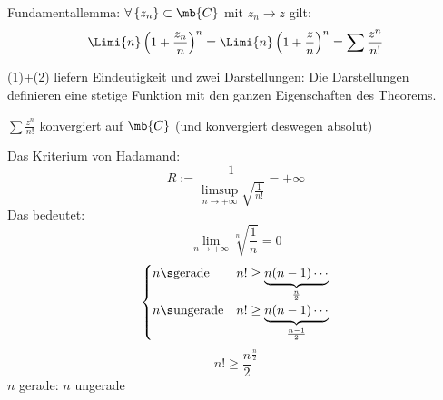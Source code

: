\begin{Lem}
  Fundamentallemma: $\forall \left\{ z_n \right\}\subset\mb{C}$ mit $z_n\to z$ gilt:
  \[\Limi{n}\left( 1+\frac{z_n}{n}\right)^n=\Limi{n}\left( 1+\frac{z}{n}\right)^n=\sum \frac{z^n}{n!}\]
\end{Lem}
\begin{Bem}
  (1)+(2) liefern Eindeutigkeit und zwei Darstellungen: Die Darstellungen definieren eine stetige Funktion mit den ganzen Eigenschaften des Theorems.
\end{Bem}
\begin{Bem}
  $\sum \frac{z^n}{n!}$ konvergiert auf $\mb{C}$ (und konvergiert deswegen absolut)
\end{Bem}
\begin{Bew}
  Das Kriterium von Hadamand:
  \[R:=\frac{1}{\limsup_{n\to+\infty}\sqrt{\frac{1}{n!}}}=+\infty\]
  Das bedeutet:
  \[\lim_{n\to +\infty}\sqrt[n]{\frac{1}{n}}=0\]
  \[\begin{cases}
    n\s\text{gerade}& n!\geq \underbrace{n(n-1)\cdots}_{\frac{n}{2}}\\
    n\s\text{ungerade}& n!\geq \underbrace{n(n-1)\cdots}_{\frac{n-1}{2}}\\
  \end{cases}\]
  \[n!\geq\frac{n}{2}^{\frac{n}{2}}\]
  $n$ gerade:
  $n$ ungerade
\end{Bew}
